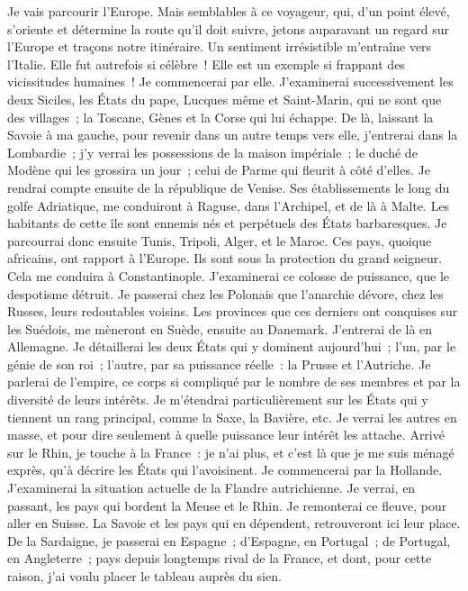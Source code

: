 \documentclass[french,twoside]{book} %
\begin{document}
Je vais parcourir l’Europe. Mais semblables à ce voyageur, qui, d’un point élevé, s’oriente et détermine la route qu’il doit suivre, jetons auparavant un regard sur l’Europe et traçons notre itinéraire. Un sentiment irrésistible m’entraîne vers l’Italie. Elle fut autrefois si célèbre ! Elle est un exemple si frappant des vicissitudes humaines ! Je commencerai par elle. J’examinerai successivement les deux Siciles, les États du pape, Lucques même et Saint-Marin, qui ne sont que des villages ; la Toscane, Gènes et la Corse qui lui échappe. De là, laissant la Savoie à ma gauche, pour revenir dans un autre temps vers elle, j’entrerai dans la Lombardie ; j’y verrai les possessions de la maison impériale ; le duché de Modène qui les grossira un jour ; celui de Parme qui fleurit à côté d’elles. Je rendrai compte ensuite de la république de Venise. Ses établissements le long du golfe Adriatique, me conduiront à Raguse, dans l’Archipel, et de là à Malte. Les habitants de cette île sont ennemis nés et perpétuels des États barbaresques. Je parcourrai donc ensuite Tunis, Tripoli, Alger, et le Maroc. Ces pays, quoique africains, ont rapport à l’Europe. Ils sont sous la protection du grand seigneur. Cela me conduira à Constantinople. J’examinerai ce colosse de puissance, que le despotisme détruit. Je passerai chez les Polonais que l’anarchie dévore, chez les Russes, leurs redoutables voisins. Les provinces que ces derniers ont conquises sur les Suédois, me mèneront en Suède, ensuite au Danemark. J’entrerai de là en Allemagne. Je détaillerai les deux États qui y dominent aujourd’hui ; l’un, par le génie de son roi ; l’autre, par sa puissance réelle : la Prusse et l’Autriche. Je parlerai de l’empire, ce corps si compliqué par le nombre de ses membres et par la diversité de leurs intérêts. Je m’étendrai particulièrement sur les États qui y tiennent un rang principal, comme la Saxe, la Bavière, etc. Je verrai les autres en masse, et pour dire seulement à quelle puissance leur intérêt les attache. Arrivé sur le Rhin, je touche à la France : je n’ai plus, et c’est là que je me suis ménagé exprès, qu’à décrire les États qui l’avoisinent. Je commencerai par la Hollande. J’examinerai la situation actuelle de la Flandre autrichienne. Je verrai, en passant, les pays qui bordent la Meuse et le Rhin. Je remonterai ce fleuve, pour aller en Suisse. La Savoie et les pays qui en dépendent, retrouveront ici leur place. De la Sardaigne, je passerai en Espagne ; d’Espagne, en Portugal ; de Portugal, en Angleterre ; pays depuis longtemps rival de la France, et dont, pour cette raison, j’ai voulu placer le tableau auprès du sien.\par
\end{document}
